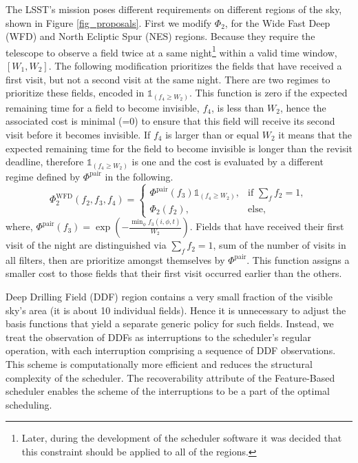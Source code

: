 \documentclass[12pt]{aastex62}
\theoremstyle{definition}
\begin{document}
The LSST's mission poses different requirements on different regions of the sky, shown in Figure \ref{fig_proposals}. First we modify $\Phi_2$, for the Wide Fast Deep (WFD) and North Ecliptic Spur (NES) regions. Because they require the telescope to observe a field twice at a same night\footnote{Later, during the development of the scheduler software it was decided that this constraint should be applied to all of the regions.} within a valid time window, $[W_1,W_2]$. The following modification prioritizes the fields that have received a first visit, but not a second visit at the same night. There are two regimes to prioritize these fields, encoded in $\mathds{1}_{(f_4 \geq W_2)}$. This function is zero if the expected remaining time for a field to become invisible, $f_4$, is less than $W_2$, hence the associated cost is minimal (=0) to ensure that this field will receive its second visit before it becomes invisible. If $f_4$ is larger than or equal $W_2$ it means that the expected remaining time for the field to become invisible is longer than the revisit deadline, therefore $\mathds{1}_{(f_4 \geq W_2)}$ is one and the cost is evaluated by a different regime defined by $\Phi^{\text{pair}}$ in the following.
%
\begin{equation*}
\Phi_2^{\text{WFD}}(f_2,f_3,f_4) =\begin{cases} \Phi^{\text{pair}}(f_3) \mathds{1}_{(f_4 \geq W_2)},& \text{if } \sum\limits_{f}{f_2} = 1,\\ \Phi_2(f_2),& \text{else,} \end{cases}
\end{equation*}
%
where, $\Phi^{\text{pair}}(f_3) = \exp(- \frac{\min_{\phi}f_3(i,\phi,t)}{W_2})$. Fields that have received their first visit of the night are distinguished via $\sum\limits_{f}{f_2} = 1$, sum of the number of visits in all filters, then are prioritize amongst themselves by $\Phi^{\text{pair}}$. This function assigns a smaller cost to those fields that their first visit occurred earlier than the others.

Deep Drilling Field (DDF) region contains a very small fraction of the visible sky's area (it is about 10 individual fields). Hence it is unnecessary to adjust the basis functions that yield a separate generic policy for such fields. Instead, we treat the observation of DDFs as interruptions to the scheduler's regular operation, with each interruption comprising a sequence of DDF observations. This scheme is computationally more efficient and reduces the structural complexity of the scheduler. The recoverability attribute of the Feature-Based scheduler enables the scheme of the interruptions to be a part of the optimal scheduling.
\end{document}
